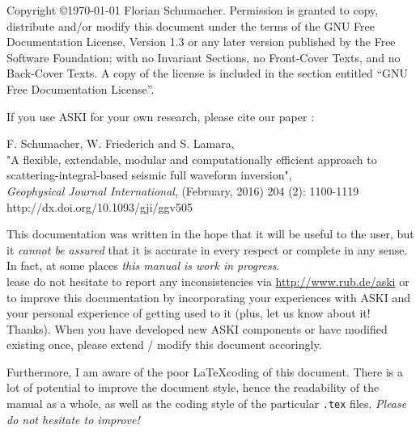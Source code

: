 \documentclass[12pt,a4paper]{book}
\newcommand{\lcode}[1]{\nolinkurl{#1}}
\newcommand{\ASKI}{{\ttfamily ASKI}}
\begin{document}
%
\setlength{\parindent}{0em}
\setlength{\parskip}{0.5em}
%
%

%
Copyright \copyright {\myyear \today} Florian Schumacher.
Permission is granted to copy, distribute and/or modify this document
under the terms of the GNU Free Documentation License, Version 1.3
or any later version published by the Free Software Foundation;
with no Invariant Sections, no Front-Cover Texts, and no Back-Cover Texts.
A copy of the license is included in the section entitled ``GNU
Free Documentation License''.

\vspace{1cm}

If you use \ASKI{} for your own research, please cite our paper \cite{Schumacher16}:

F. Schumacher, W. Friederich and S. Lamara, \\
"A flexible, extendable, modular and 
computationally efficient approach to scattering-integral-based seismic full waveform 
inversion", \\
\emph{Geophysical Journal International}, (February, 2016) 204 (2): 1100-1119\\
http://dx.doi.org/10.1093/gji/ggv505

\vspace{1em}

This documentation was written in the hope that it will be useful to the user,
but it \emph{cannot be assured} that it is accurate in every respect or complete in any sense.
In fact, at some places \emph{this manual is work in progress}.\\
lease do not hesitate to report any inconsistencies via \url{http://www.rub.de/aski} or
to improve this documentation by incorporating your experiences with \ASKI{} 
and your personal experience of getting used to it (plus, let us know about it! Thanks). 
When you have developed new \ASKI{} components or 
have modified existing once, please extend / modify this document accoringly.

Furthermore, I am aware of the poor \LaTeX coding of this document. There is a lot of potential
to improve the document 
style, hence the readability of the manual as a whole, as well as the coding style of the 
particular \lcode{.tex} files. \emph{Please do not hesitate to improve!}
\end{document}
